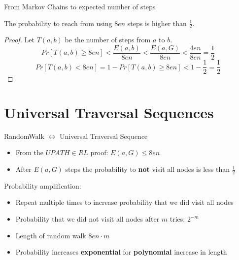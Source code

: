 \begin{frame}{From Markov Chains to expected number of steps}

\begin{theorem}
The probability to reach  from  using $8en$ steps is higher than $\frac{1}{2}$.
\end{theorem}

\begin{proof}
Let $T(a, b)$ be the number of steps from $a$ to $b$.
$$
Pr[T(a, b) \geq 8en] < \frac{E(a, b)}{8en}
                     < \frac{E(a, G)}{8en}
                     < \frac{4en}{8en} = \frac{1}{2}
$$
$$
Pr[T(a, b) < 8en] = 1 - Pr[T(a, b) \geq 8en]
                  < 1 - \frac{1}{2} = \frac{1}{2}
$$
\end{proof}

\end{frame}

\section{Universal Traversal
Sequences}\label{universal-traversal-sequences}

\begin{frame}{RandomWalk $\leftrightarrow$ Universal Traversal Sequence}

\begin{itemize}
\itemsep1pt\parskip0pt
\item
  From the $UPATH \in RL$ proof: $E(a, G) \leq 8en$
\item
  After $E(a, G)$ steps the probability to \textbf{not} visit all nodes
  is less than $\frac{1}{2}$
\end{itemize}

Probability amplification:

\begin{itemize}
\itemsep1pt\parskip0pt
\item
  Repeat multiple times to increase probability that we did visit all
  nodes
\item
  Probability that we did not visit all nodes after $m$ tries: $2^{-m}$
\item
  Length of random walk $8en \cdot m$
\item
  Probability increases \textbf{exponential} for \textbf{polynomial}
  increase in length
\end{itemize}

\end{frame}

